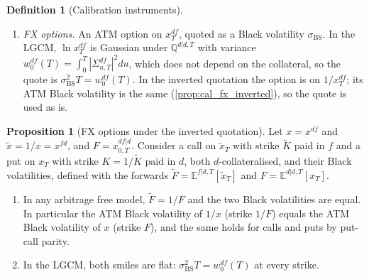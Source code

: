 \documentclass[11pt,english]{amsart}
\newcommand{\BS}{\mathrm{BS}}
\newcommand{\EE}{\mathbb{E}}
\newcommand{\QQ}{\mathbb{Q}}
\theoremstyle{definition}
\newtheorem{prop}{Proposition}
\newtheorem{defi}{Definition}
\begin{document}
\begin{defi}[Calibration instruments]
\begin{enumerate}
\item \emph{FX options.} An ATM option on $x^{df}_T$, quoted as a Black volatility $\sigma_\BS$. In the LGCM, $\ln x^{df}_T$ is Gaussian under $\QQ^{d|d,T}$ with variance $w^{df}_0(T) = \int_0^T|\Sigma^{df}_{u,T}|^2du$, which does not depend on the collateral, so the quote is $\sigma_\BS^2 T = w^{df}_0(T)$. In the inverted quotation the option is on $1/x^{df}_T$; its ATM Black volatility is the same (\autoref{prop:cal_fx_inverted}), so the quote is used as is.
\end{enumerate}
\end{defi}

\begin{prop}[FX options under the inverted quotation]\label{prop:cal_fx_inverted}
Let $x = x^{df}$ and $\tilde{x} = 1/x = x^{fd}$, and $F = x^{df|d}_{0,T}$. Consider a call on $\tilde{x}_T$ with strike $\tilde{K}$ paid in $f$ and a put on $x_T$ with strike $K = 1/\tilde{K}$ paid in $d$, both $d$-collateralised, and their Black volatilities, defined with the forwards $\tilde{F} = \EE^{f|d,T}[\tilde{x}_T]$ and $F = \EE^{d|d,T}[x_T]$.
\begin{enumerate}
\item In any arbitrage free model, $\tilde{F} = 1/F$ and the two Black volatilities are equal. In particular the ATM Black volatility of $1/x$ (strike $1/F$) equals the ATM Black volatility of $x$ (strike $F$), and the same holds for calls and puts by put-call parity.
\item In the LGCM, both smiles are flat: $\sigma_\BS^2T = w^{df}_0(T)$ at every strike.
\end{enumerate}
\end{prop}
\end{document}
